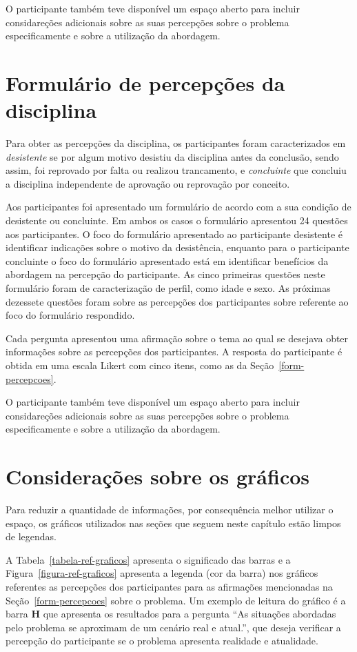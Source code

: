 O participante também teve disponível um espaço aberto para incluir considareções adicionais sobre
as suas percepções sobre o problema especificamente e sobre a utilização da abordagem.

\section{Formulário de percepções da disciplina}
\label{form-disciplinas}
Para obter as percepções da disciplina, os participantes foram caracterizados em \textit{desistente}
se por algum motivo desistiu da disciplina antes da conclusão, sendo assim, foi reprovado por
falta ou realizou trancamento, e \textit{concluinte} que concluiu a disciplina independente
de aprovação ou reprovação por conceito.

Aos participantes foi apresentado um formulário de acordo com a sua condição de desistente
ou concluinte.
Em ambos os casos o formulário apresentou 24 questões aos participantes.
O foco do formulário apresentado ao participante desistente é identificar indicações
sobre o motivo da desistência, enquanto para o participante concluinte o foco do
formulário apresentado está em identificar benefícios da abordagem na percepção
do participante.
As cinco primeiras questões neste formulário foram de caracterização de perfil, como
idade e sexo.
As próximas dezessete questões foram sobre as percepções dos participantes sobre referente
ao foco do formulário respondido.

Cada pergunta apresentou uma afirmação sobre o tema ao qual se desejava obter informações sobre as
percepções dos participantes.
A resposta do participante é obtida em uma escala Likert com cinco itens, como as da Seção~\ref{form-percepcoes}.

O participante também teve disponível um espaço aberto para incluir considareções adicionais sobre
as suas percepções sobre o problema especificamente e sobre a utilização da abordagem.

\section{Considerações sobre os gráficos}
\label{sec-ref-graficos}
Para reduzir a quantidade de informações, por consequência melhor utilizar o
espaço, os gráficos utilizados nas seções que seguem neste capítulo
estão limpos de legendas.

A Tabela~\ref{tabela-ref-graficos} apresenta o significado das barras
e a Figura~\ref{figura-ref-graficos} apresenta a legenda (cor da barra)
nos gráficos referentes as percepções dos participantes para as
afirmações mencionadas na Seção~\ref{form-percepcoes} sobre
o problema.
Um exemplo de leitura do gráfico é a barra \textbf{H} que apresenta
os resultados para a pergunta ``As situações abordadas pelo problema
se aproximam de um cenário real e atual.'', que deseja verificar
a percepção do participante se o problema apresenta realidade
e atualidade.

